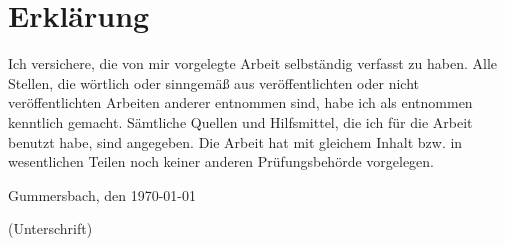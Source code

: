 \documentclass[12pt,oneside,a4paper,bibtotoc,liststotoc]{scrreprt}
\begin{document}
\chapter{Erklärung}

Ich versichere, die von mir vorgelegte Arbeit selbständig verfasst zu
haben. Alle Stellen, die wörtlich oder sinngemäß aus veröffentlichten
oder nicht veröffentlichten Arbeiten anderer entnommen sind, habe ich
als entnommen kenntlich gemacht. Sämtliche Quellen und Hilfsmittel,
die ich für die Arbeit benutzt habe, sind angegeben. Die Arbeit hat
mit gleichem Inhalt bzw. in wesentlichen Teilen noch keiner anderen
Prüfungsbehörde vorgelegen.

\bigskip

Gummersbach, den \today

\bigskip

\bigskip

\bigskip

\bigskip

\bigskip

\bigskip

(Unterschrift)
\end{document}
